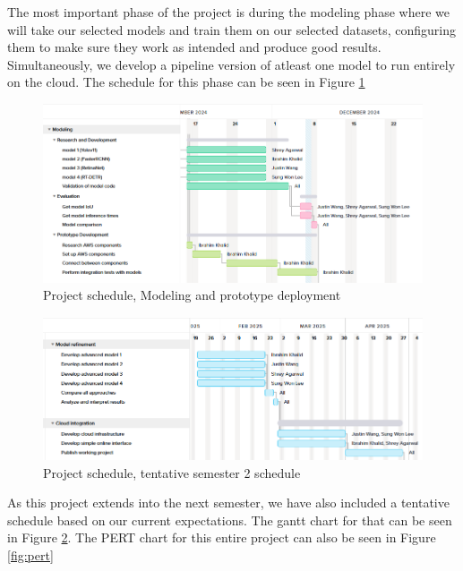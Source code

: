\documentclass[stu,12pt,floatsintext]{apa7}
\begin{document}
The most important phase of the project is during the modeling phase where we will take our selected models and train them on our selected datasets, configuring them to make sure they work as intended and produce good results. Simultaneously, we develop a pipeline version of atleast one model to run entirely on the cloud. The schedule for this phase can be seen in Figure \ref{fig:gantt_3}

\begin{figure}[!htb]
    \centering
    \includegraphics[width=0.8\linewidth]{images/gantt/gantt_3.png}
    \caption{Project schedule, Modeling and prototype deployment}
    \label{fig:gantt_3}
\end{figure}

\begin{figure}[!htb]
    \centering
    \includegraphics[width=0.8\linewidth]{images/gantt/gantt_4.png}
    \caption{Project schedule, tentative semester 2 schedule}
    \label{fig:gantt_4}
\end{figure}



As this project extends into the next semester, we have also included a tentative schedule based on our current expectations. The gantt chart for that can be seen in Figure \ref{fig:gantt_4}. The PERT chart for this entire project can also be seen in Figure \ref{fig:pert}
\end{document}
